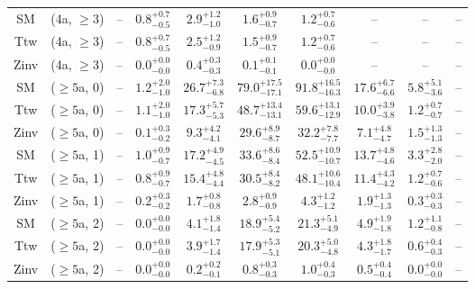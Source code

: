 \begin{table}[h!]
{\begin{tabular}{cccccccccc}
	SM & (4a, $\ge3$) & -- & $0.8^{+ 0.7 }_{- 0.5 }$ & $2.9^{+ 1.2 }_{- 1.0 }$ & $1.6^{+ 0.9 }_{- 0.7 }$ & $1.2^{+ 0.7 }_{- 0.6 }$ & -- & -- & -- \\[0.5ex] 
	Ttw & (4a, $\ge3$) & -- & $0.8^{+ 0.7 }_{- 0.5 }$ & $2.5^{+ 1.2 }_{- 0.9 }$ & $1.5^{+ 0.9 }_{- 0.7 }$ & $1.2^{+ 0.7 }_{- 0.6 }$ & -- & -- & -- \\[0.5ex] 
	Zinv & (4a, $\ge3$) & -- & $0.0^{+ 0.0 }_{- 0.0 }$ & $0.4^{+ 0.3 }_{- 0.3 }$ & $0.1^{+ 0.1 }_{- 0.1 }$ & $0.0^{+ 0.0 }_{- 0.0 }$ & -- & -- & -- \\[0.5ex] 
	SM & ($\ge5$a, 0) & -- & $1.2^{+ 2.0 }_{- 1.0 }$ & $26.7^{+ 7.3 }_{- 6.8 }$ & $79.0^{+ 17.5 }_{- 17.1 }$ & $91.8^{+ 16.5 }_{- 16.3 }$ & $17.6^{+ 6.7 }_{- 6.6 }$ & $5.8^{+ 5.1 }_{- 3.6 }$ & -- \\[0.5ex] 
	Ttw & ($\ge5$a, 0) & -- & $1.1^{+ 2.0 }_{- 1.0 }$ & $17.3^{+ 5.7 }_{- 5.3 }$ & $48.7^{+ 13.4 }_{- 13.1 }$ & $59.6^{+ 13.1 }_{- 12.9 }$ & $10.0^{+ 3.9 }_{- 3.8 }$ & $1.2^{+ 0.7 }_{- 0.7 }$ & -- \\[0.5ex] 
	Zinv & ($\ge5$a, 0) & -- & $0.1^{+ 0.3 }_{- 0.2 }$ & $9.3^{+ 4.2 }_{- 4.1 }$ & $29.6^{+ 8.9 }_{- 8.7 }$ & $32.2^{+ 7.8 }_{- 7.7 }$ & $7.1^{+ 4.8 }_{- 4.7 }$ & $1.5^{+ 1.3 }_{- 1.3 }$ & -- \\[0.5ex] 
	SM & ($\ge5$a, 1) & -- & $1.0^{+ 0.9 }_{- 0.7 }$ & $17.2^{+ 4.9 }_{- 4.5 }$ & $33.6^{+ 8.6 }_{- 8.4 }$ & $52.5^{+ 10.9 }_{- 10.7 }$ & $13.7^{+ 4.8 }_{- 4.6 }$ & $3.3^{+ 2.8 }_{- 2.0 }$ & -- \\[0.5ex] 
	Ttw & ($\ge5$a, 1) & -- & $0.8^{+ 0.9 }_{- 0.7 }$ & $15.4^{+ 4.8 }_{- 4.4 }$ & $30.5^{+ 8.4 }_{- 8.2 }$ & $48.1^{+ 10.6 }_{- 10.4 }$ & $11.4^{+ 4.3 }_{- 4.2 }$ & $1.2^{+ 0.7 }_{- 0.6 }$ & -- \\[0.5ex] 
	Zinv & ($\ge5$a, 1) & -- & $0.2^{+ 0.3 }_{- 0.2 }$ & $1.7^{+ 0.8 }_{- 0.8 }$ & $2.8^{+ 0.9 }_{- 0.9 }$ & $4.3^{+ 1.2 }_{- 1.2 }$ & $1.9^{+ 1.3 }_{- 1.3 }$ & $0.3^{+ 0.3 }_{- 0.3 }$ & -- \\[0.5ex] 
	SM & ($\ge5$a, 2) & -- & $0.0^{+ 0.0 }_{- 0.0 }$ & $4.1^{+ 1.8 }_{- 1.4 }$ & $18.9^{+ 5.4 }_{- 5.2 }$ & $21.3^{+ 5.1 }_{- 4.9 }$ & $4.9^{+ 1.9 }_{- 1.8 }$ & $1.2^{+ 1.1 }_{- 0.8 }$ & -- \\[0.5ex] 
	Ttw & ($\ge5$a, 2) & -- & $0.0^{+ 0.0 }_{- 0.0 }$ & $3.9^{+ 1.7 }_{- 1.4 }$ & $17.9^{+ 5.3 }_{- 5.1 }$ & $20.3^{+ 5.0 }_{- 4.8 }$ & $4.3^{+ 1.8 }_{- 1.7 }$ & $0.6^{+ 0.4 }_{- 0.3 }$ & -- \\[0.5ex] 
	Zinv & ($\ge5$a, 2) & -- & $0.0^{+ 0.0 }_{- 0.0 }$ & $0.2^{+ 0.2 }_{- 0.1 }$ & $0.8^{+ 0.3 }_{- 0.3 }$ & $1.0^{+ 0.4 }_{- 0.3 }$ & $0.5^{+ 0.4 }_{- 0.4 }$ & $0.0^{+ 0.0 }_{- 0.0 }$ & -- \\[0.5ex] 

\end{tabular}}
\end{table}
